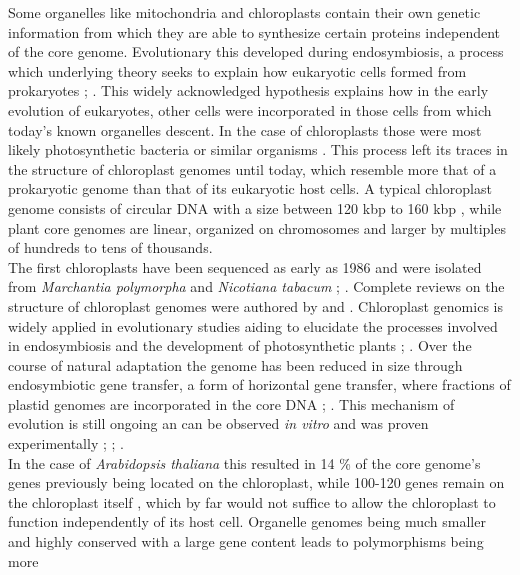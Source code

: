 Some organelles like mitochondria and chloroplasts contain their own genetic information
from which they are able to synthesize certain proteins independent of the core
genome. Evolutionary this developed during endosymbiosis, a process which underlying
theory seeks to explain how eukaryotic cells formed from prokaryotes
\cite{mereschkowsky1905uber}; \cite{kutschera2005endosymbiosis}. This widely acknowledged
hypothesis explains how in the early evolution of eukaryotes, other cells were
incorporated in those cells from which today's known organelles descent. In the case of
chloroplasts those were most likely photosynthetic bacteria or similar organisms
\cite{archibald2015endosymbiosis}. This process left its traces in the structure of
chloroplast genomes until today, which resemble more that of a prokaryotic genome than
that of its eukaryotic host cells. A typical chloroplast genome consists of circular DNA
with a size between 120 kbp to 160 kbp \cite{palmer_1985}, while plant core genomes are
linear, organized on chromosomes and larger by multiples of
hundreds to tens of thousands. \\
The first chloroplasts have been sequenced as early as 1986 and were isolated from
\textit{Marchantia polymorpha} and \textit{Nicotiana tabacum}
\cite{ohyama_chloroplast_1986}; \cite{shinozaki_complete_1986}. Complete reviews on the
structure of chloroplast genomes were authored by \cite{green_chloroplast_2011} and
\cite{wicke_evolution_2011}. Chloroplast genomics is widely applied in evolutionary
studies aiding to elucidate the processes involved in endosymbiosis and the development of
photosynthetic plants \cite{martin_evolutionary_2002};
\cite{xiao-ming_inferring_2017}. Over the course of natural adaptation the genome has been
reduced in size through endosymbiotic gene transfer, a form of horizontal gene transfer,
where fractions of plastid genomes are incorporated in the core DNA
\cite{martin_evolutionary_2002}; \cite{deiner_environmental_2017}. This mechanism of
evolution is still ongoing an can be observed \textit{in vitro} and was proven
experimentally \cite{bock2017witnessing};
\cite{fuentes2014horizontal}; \cite{stegemann2009exchange}. \\
In the case of \textit{Arabidopsis thaliana} this resulted in 14 \% of the core genome's
genes previously being located on the chloroplast, while 100-120 genes remain on the
chloroplast itself \cite{wicke_evolution_2011}, which by far would not suffice to allow
the chloroplast to function independently of its host cell. Organelle genomes being much
smaller and highly conserved with a large gene content leads to polymorphisms being more
